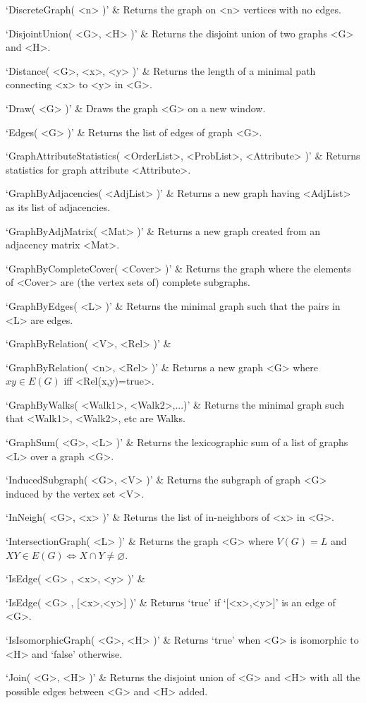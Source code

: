 `DiscreteGraph( <n> )' & 
Returns the graph on <n> vertices with no edges.

`DisjointUnion( <G>, <H> )' & 
Returns the disjoint union of two graphs <G> and <H>.

`Distance( <G>, <x>, <y> )' & 
Returns the length of a minimal path connecting <x> to <y> in <G>.

`Draw( <G> )' & 
Draws the graph <G> on a new window.

`Edges( <G> )' & 
Returns the list of edges of graph <G>.

`GraphAttributeStatistics( <OrderList>, <ProbList>, <Attribute> )' &
Returns statistics for graph attribute <Attribute>. 

`GraphByAdjacencies( <AdjList> )' & 
Returns  a  new  graph  having  <AdjList>  as its list of adjacencies.

`GraphByAdjMatrix( <Mat> )' & 
Returns  a  new  graph  created from an adjacency matrix <Mat>.

`GraphByCompleteCover( <Cover> )' & 
Returns the graph where the elements of <Cover> are (the vertex sets of) complete subgraphs.

`GraphByEdges( <L> )' & 
Returns the minimal graph such that the pairs in <L> are edges.

`GraphByRelation( <V>, <Rel> )' & 

`GraphByRelation( <n>, <Rel> )' & 
Returns  a  new  graph  <G> where $xy \in E(G)$ iff <Rel(x,y)=true>.

`GraphByWalks( <Walk1>, <Walk2>,...)' & 
Returns the minimal graph such that <Walk1>, <Walk2>, etc are Walks.

`GraphSum( <G>, <L> )' & 
Returns the lexicographic sum of a list of graphs <L> over a graph <G>.

`InducedSubgraph( <G>, <V> )' & 
Returns the subgraph of graph <G> induced by the vertex set <V>.

`InNeigh( <G>, <x> )' & 
Returns the list of in-neighbors of <x> in <G>.

`IntersectionGraph( <L> )' & 
Returns the graph <G> where $V(G)=L$ and $XY\in E(G) \iff X\cap Y \neq \varnothing$.

`IsEdge( <G> , <x>, <y> )' & 

`IsEdge( <G> , [<x>,<y>] )' & 
Returns `true' if `[<x>,<y>]' is an edge of <G>.

`IsIsomorphicGraph( <G>, <H> )' & 
Returns `true' when <G> is isomorphic to <H> and `false' otherwise.

`Join( <G>, <H> )' & 
Returns the disjoint union of <G> and <H> with all the possible edges between <G> and <H> added.

